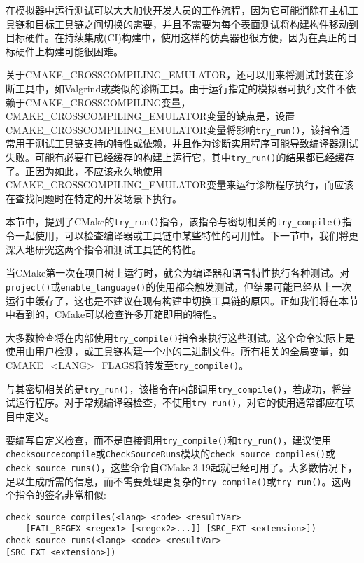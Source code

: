在模拟器中运行测试可以大大加快开发人员的工作流程，因为它可能消除在主机工具链和目标工具链之间切换的需要，并且不需要为每个表面测试将构建构件移动到目标硬件。在持续集成(CI)构建中，使用这样的仿真器也很方便，因为在真正的目标硬件上构建可能很困难。

关于CMAKE\_CROSSCOMPILING\_EMULATOR，还可以用来将测试封装在诊断工具中，如Valgrind或类似的诊断工具。由于运行指定的模拟器可执行文件不依赖于CMAKE\_CROSSCOMPILING变量，CMAKE\_CROSSCOMPILING\_EMULATOR变量的缺点是，设置CMAKE\_CROSSCOMPILING\_EMULATOR变量将影响\texttt{try\_run()}，该指令通常用于测试工具链支持的特性或依赖，并且作为诊断实用程序可能导致编译器测试失败。可能有必要在已经缓存的构建上运行它，其中\texttt{try\_run()}的结果都已经缓存了。正因为如此，不应该永久地使用CMAKE\_CROSSCOMPILING\_EMULATOR变量来运行诊断程序执行，而应该在查找问题时在特定的开发场景下执行。

本节中，提到了CMake的\texttt{try\_run()}指令，该指令与密切相关的\texttt{try\_compile()}指令一起使用，可以检查编译器或工具链中某些特性的可用性。下一节中，我们将更深入地研究这两个指令和测试工具链的特性。


当CMake第一次在项目树上运行时，就会为编译器和语言特性执行各种测试。对\texttt{project()}或\texttt{enable\_language()}的使用都会触发测试，但结果可能已经从上一次运行中缓存了，这也是不建议在现有构建中切换工具链的原因。正如我们将在本节中看到的，CMake可以检查许多开箱即用的特性。

大多数检查将在内部使用\texttt{try\_compile()}指令来执行这些测试。这个命令实际上是使用由用户检测，或工具链构建一个小的二进制文件。所有相关的全局变量，如CMAKE\_<LANG>\_FLAGS将转发至\texttt{try\_compile()}。

与其密切相关的是\texttt{try\_run()}，该指令在内部调用\texttt{try\_compile()}，若成功，将尝试运行程序。对于常规编译器检查，不使用\texttt{try\_run()}，对它的使用通常都应在项目中定义。

要编写自定义检查，而不是直接调用\texttt{try\_compile()}和\texttt{try\_run()}，建议使用\texttt{checksourcecompile}或\texttt{CheckSourceRuns}模块的\texttt{check\_source\_compiles()}或\texttt{check\_source\_runs()}，这些命令自CMake 3.19起就已经可用了。大多数情况下，足以生成所需的信息，而不需要处理更复杂的\texttt{try\_compile()}或\texttt{try\_run()}。这两个指令的签名非常相似:

\begin{lstlisting}[style=styleCMake]
check_source_compiles(<lang> <code> <resultVar>
	[FAIL_REGEX <regex1> [<regex2>...]] [SRC_EXT <extension>])
check_source_runs(<lang> <code> <resultVar>
[SRC_EXT <extension>])
\end{lstlisting}

